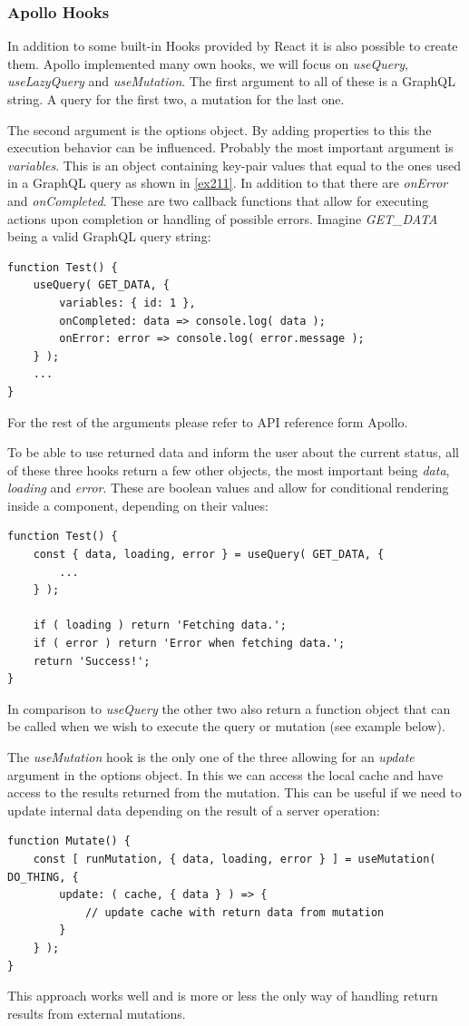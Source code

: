 \subsubsection{Apollo Hooks}
In addition to some built-in Hooks provided by React it is also possible to create them. Apollo implemented many own hooks, we will focus on \emph{useQuery}, \emph{useLazyQuery} and \emph{useMutation}.
The first argument to all of these is a GraphQL string. A query for the first two, a mutation for the last one.

The second argument is the options object. By adding properties to this the execution behavior can be influenced. Probably the most important argument is \emph{variables}. This is an object containing key-pair values that equal to the ones used in a GraphQL query as shown in \autoref{ex211}. In addition to that there are \emph{onError} and \emph{onCompleted}. These are two callback functions that allow for executing actions upon completion or handling of possible errors. Imagine \emph{GET\_DATA} being a valid GraphQL query string:
\begin{lstlisting}[caption={The useQuery Hook from Apollo}]
function Test() {
	useQuery( GET_DATA, {
		variables: { id: 1 },
		onCompleted: data => console.log( data );
		onError: error => console.log( error.message );
	} );
	...
}
\end{lstlisting}

For the rest of the arguments please refer to API reference form Apollo.

To be able to use returned data and inform the user about the current status, all of these three hooks return a few other objects, the most important being \emph{data}, \emph{loading} and \emph{error}. These are boolean values and allow for conditional rendering inside a component, depending on their values: 
\begin{lstlisting}[caption={Demonstration of the useQuery Hook}]
function Test() {
	const { data, loading, error } = useQuery( GET_DATA, {
		...	
	} );
	
	if ( loading ) return 'Fetching data.';
	if ( error ) return 'Error when fetching data.';
	return 'Success!';
}
\end{lstlisting}

In comparison to \emph{useQuery} the other two also return a function object that can be called when we wish to execute the query or mutation (see example below).

The \emph{useMutation} hook is the only one of the three allowing for an \emph{update} argument in the options object. In this we can access the local cache and have access to the results returned from the mutation. This can be useful if we need to update internal data depending on the result of a server operation:
\begin{lstlisting}[caption={Creating a Mutation and defining a manual update function},label={ex:usingMutation}]
function Mutate() {
	const [ runMutation, { data, loading, error } ] = useMutation( DO_THING, {
		update: ( cache, { data } ) => {
			// update cache with return data from mutation
		}	
	} );
}
\end{lstlisting}
This approach works well and is more or less the only way of handling return results from external mutations. 


